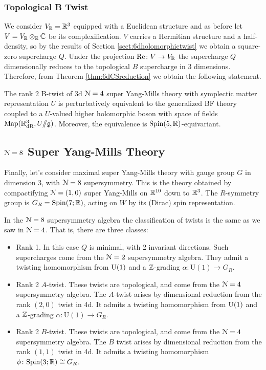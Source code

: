 \documentclass[10pt, oneside]{article}
\renewcommand{\Re}{\mathrm{Re}}
\renewcommand{\U}{\mathrm{U}}
\newcommand{\ham}{/\!\!/}
\begin{document}
\subsubsection{Topological B Twist}
\label{sect:3d_4_B_twist}
We consider $V_\mathbb R=\mathbb R^3$ equipped with a Euclidean structure and as before let $V=V_\mathbb R\otimes_\mathbb R\mathbb C$ be its complexification. $V$ carries a Hermitian structure and a half-density, so by the results of Section \ref{sect:6dholomorphictwist} we obtain a square-zero supercharge $Q$. Under the projection $\Re\colon V\rightarrow V_\RR$ the supercharge $Q$ dimensionally reduces to the topological $B$ supercharge in 3 dimensions. Therefore, from Theorem \ref{thm:6dCSreduction} we obtain the following statement.

\begin{theorem} \label{3d_4_B_twist_thm}
The rank $2$ B-twist of 3d $\mathcal{N}=4$ super Yang-Mills theory with symplectic matter representation $U$ is perturbatively equivalent to the generalized BF theory coupled to a $U$-valued higher holomorphic boson with space of fields $\mr{Map}(\RR^3_{\mr{dR}}, U\ham \gg)$. Moreover, the equivalence is $\mathrm{Spin}(5, \mathbb R)$-equivariant. 
\end{theorem}

\subsection{\texorpdfstring{$\mathcal N = 8$}{N=8} Super Yang-Mills Theory} \label{3d_8_section}
Finally, let's consider maximal super Yang-Mills theory with gauge group $G$ in dimension 3, with $\mathcal{N}=8$ supersymmetry.  This is the theory obtained by compactifying $\mathcal{N}=(1,0)$ super Yang-Mills on $\mathbb R^{10}$ down to $\mathbb R^3$.  The $R$-symmetry group is $G_R = \mathrm{Spin}(7;\mathbb R)$, acting on $W$ by its (Dirac) spin representation.

In the $\mathcal{N}=8$ supersymmetry algebra the classification of twists is the same as we saw in $\mathcal{N}=4$.  That is, there are three classes: 
\begin{itemize}
 \item Rank 1.  In this case $Q$ is minimal, with 2 invariant directions.  Such supercharges come from the $\mathcal{N}=2$ supersymmetry algebra.  They admit a twisting homomorphism from $\mathrm{U}(1)$ and a $\mathbb Z$-grading $\alpha \colon \U(1) \to G_R$.
 \item Rank 2 $A$-twist.  These twists are topological, and come from the $\mathcal{N}=4$ supersymmetry algebra.  The $A$-twist arises by dimensional reduction from the rank $(2,0)$ twist in 4d.  It admits a twisting homomorphism from $\mathrm{U}(1)$ and a $\mathbb Z$-grading $\alpha \colon \U(1) \to G_R$.
 \item Rank 2 $B$-twist.   These twists are topological, and come from the $\mathcal{N}=4$ supersymmetry algebra. The $B$ twist arises by dimensional reduction from the rank $(1,1)$ twist in 4d.  It admits a twisting homomorphism $\phi \colon \mathrm{Spin}(3;\mathbb R) \cong G_R$.
\end{itemize}
 
\end{document}
